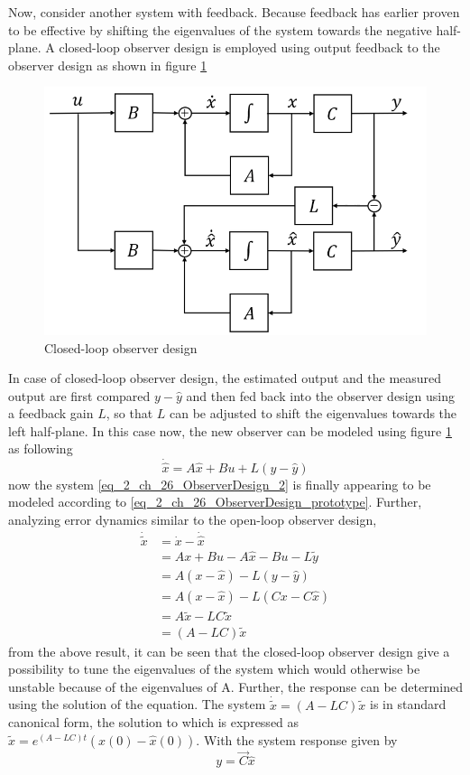Now, consider another system with feedback. Because feedback has earlier proven to be effective by shifting the eigenvalues of the system towards the negative half-plane. A closed-loop observer design is employed using output feedback to the observer design as shown in figure \ref{fig_2_ch_26_ObserverDeisgn2}
\begin{figure}[h!]
	\centering
	\includegraphics[width=0.6\linewidth]{Bilder/ObserverDesign2.png}
	\caption{Closed-loop observer design}
	\label{fig_2_ch_26_ObserverDeisgn2}
\end{figure}
In case of closed-loop observer design, the estimated output and the measured output are first compared $y - \hat{y}$ and then fed back into the observer design using a feedback gain $L$, so that $L$ can be adjusted to shift the eigenvalues towards the left half-plane. In this case now, the new observer can be modeled using figure \ref{fig_2_ch_26_ObserverDeisgn2} as following
\begin{equation}\label{eq_2_ch_26_ObserverDesign_2}
\dot{\hat{x}} = A \hat{x} + Bu + L (y - \hat{y})
\end{equation}
now the system \eqref{eq_2_ch_26_ObserverDesign_2} is finally appearing to be modeled according to \eqref{eq_2_ch_26_ObserverDesign_prototype}. Further, analyzing error dynamics similar to the open-loop observer design,
\begin{align*}
\dot{\tilde{x}} &= \dot{x} - \dot{\hat{x}} \\
&= A {x} + Bu - A \hat{x} - Bu - L\tilde{y} \\
&= A(x - \hat{x}) - L (y - \hat{y}) \\
&= A(x - \hat{x}) - L (Cx - C\hat{x}) \\
&= A\tilde{x} - LC\tilde{x} \\
&= (A - LC)\tilde{x}
\end{align*}
from the above result, it can be seen that the closed-loop observer design give a possibility to tune the eigenvalues of the system which would otherwise be unstable because of the eigenvalues of A. Further, the response can be determined using the solution of the equation. The system $\dot{\tilde{x}} = (A - LC)\tilde{x}$ is in standard canonical form, the solution to which is expressed as $\tilde{x} = e^{(A-LC)t}(x(0) - \hat{x}(0))$. With the system response given by
\begin{equation}
	y = \vec{C}\hat{x}
\end{equation}

